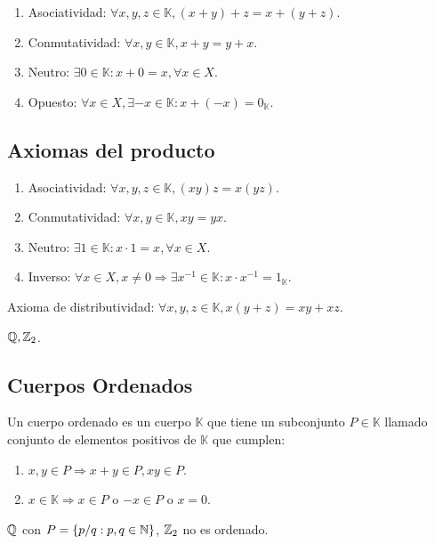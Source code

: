 \begin{enumerate}
    \item Asociatividad: \(\forall x,y,z \in \mathbb{K}, (x+y)+z=x+(y+z) \).
    \item Conmutatividad: \(\forall x,y \in \mathbb{K}, x+y=y+x \).
    \item Neutro: \( \exists 0 \in \mathbb{K} : x+0 = x, \forall x \in X \).
    \item Opuesto: \( \forall x \in X, \exists -x \in \mathbb{K} : x +(-x) = 0_\mathbb{K} \).
\end{enumerate}

\subsection{Axiomas del producto}

\begin{enumerate}
    \item Asociatividad: \(\forall x,y,z \in \mathbb{K}, (xy)z=x(yz)\).
    \item Conmutatividad: \(\forall x,y \in \mathbb{K}, xy=yx\).
    \item Neutro: \(\exists 1 \in \mathbb{K} : x \cdot 1 = x, \forall x \in X\).
    \item Inverso: \(\forall x \in X, x \neq 0 \Rightarrow \exists x^{-1} \in \mathbb{K} : x \cdot x^{-1} = 1_\mathbb{K} \).
\end{enumerate}
Axioma de distributividad: \(\forall x,y,z \in \mathbb{K}, x(y+z)=xy+xz\).

\begin{eg}
    \(\mathbb{Q}, \mathbb{Z}_2\).
\end{eg}

\subsection{Cuerpos Ordenados}

Un cuerpo ordenado es un cuerpo \(\mathbb{K} \) que tiene un subconjunto \(P \in \mathbb{K} \) llamado conjunto de elementos positivos de \(\mathbb{K} \) que cumplen:
\begin{enumerate}
    \item \(x,y \in P \Rightarrow x+y \in P, xy \in P\).
    \item \(x \in \mathbb{K} \Rightarrow x \in P\) o \(-x \in P\) o \(x=0\).
\end{enumerate}

\begin{eg}
    \(\mathbb{Q} \) con \(P = \{ p/q:p,q\in \mathbb{N} \} \), \(\mathbb{Z}_2\) no es ordenado.
\end{eg}

